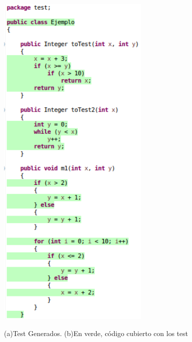 \documentclass{llncs}
\begin{document}
\begin{figure}[hbt!]
\begin{minipage}[H]{0.55\textwidth}
  \centering
  \includegraphics[width=0.65\textwidth]{screenshots/eclemma}\\
\end{minipage}
\caption{(a)Test Generados. (b)En verde, código cubierto con los test}
\label{cicloInf}
\end{figure}
\end{document}

